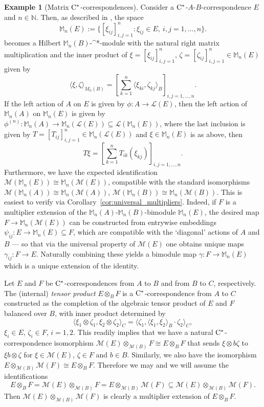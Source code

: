 \documentclass[11 pt, leqno]{amsart}
\numberwithin{equation}{section}
\theoremstyle{plain}
\theoremstyle{definition}
\newtheorem{ex}[thm]{Example}
\newcommand{\Mat}{\mathbb M} %
\newcommand{\M}{\mathcal M}
\renewcommand{\L}{\mathcal L}
\newcommand{\N}{\mathbb N}
\newcommand{\cst}{\ifmmode\mathrm{C}^*\else{$\mathrm{C}^*$}\fi}
\begin{document}
\begin{ex}[Matrix $\cst$-correspondences]\label{ex:matrixcorr}
Consider a $\cst$-$A$-$B$-correspondence $E$ and $n \in \N$. 
Then, as described in \cite[Section 3]{Ble}, the space
\[
    \Mat_n(E):=\{[\xi_{ij}]_{i,j=1}^n: \xi_{ij} \in E ,\ i,j=1,\ldots,n\}.
\]
becomes a Hilbert $\Mat_n(B)$-\cst-module with the natural right matrix multiplication and the inner product of $\xi=[\xi_{ij}]_{i,j=1}^n$,  $\zeta=[\zeta_{ij}]_{i,j=1}^n \in \Mat_n(E)$ given by 
\[ 
    \langle \xi, \zeta\rangle_{M_n(B)}= \left[\sum_{k=1}^n \langle \xi_{ki}, \zeta_{kj} \rangle_{B} \right]_{i,j=1,\ldots,n}.
\]
If the left action of $A$ on $E$ is given by $\phi:A\to \L(E)$, then the left action of $\Mat_n(A)$ on $\Mat_n(E)$ is given by $\phi^{(n)}:\Mat_n(A) \to \Mat_n(\L(E)) \subseteq \L(\Mat_n(E))$, where the last inclusion is given by $T=[T_{ij}]_{i,j=1}^n \in \Mat_n(\L(E))$ and $\xi \in \Mat_n (E)$ is as above, then 
\[ 
    T \xi = \left[\sum_{k=1}^n  T_{ik} (\xi_{kj}) \right]_{i,j=1,\ldots,n} . 
\]
Furthermore, we have the expected identification $\M(\Mat_n(E)) \cong \Mat_n(\M(E))$, compatible with the standard isomorphisms $\M(\Mat_n(A)) \cong \Mat_n(\M(A))$, $\M(\Mat_n(B)) \cong \Mat_n(\M(B))$. 
This is easiest to verify via Corollary~\ref{cor:universal_multipliers}. 
Indeed, if $F$ is a multiplier extension of the $\Mat_n(A)$-$\Mat_n(B)$-bimodule $\Mat_n(E)$, the desired map $F\to \Mat_n(\M(E))$ can be constructed from entrywise embeddings $\psi_{ij}:E \to \Mat_n(E) \subseteq F$, which are compatible with the `diagonal' actions of $A$ and $B$ --- so that via the universal property of $\M(E)$ one obtains unique maps $\gamma_{ij}:F \to E$. 
Naturally combining these yields a bimodule map $\gamma:F \to \Mat_n(E)$ which is a unique extension of the identity. 
\end{ex}

Let $E$ and $F$ be  $\cst$-correspondences from $A$ to $B$ and from $B$ to $C$, respectively. 
The (internal) \emph{tensor product} $E\otimes_B F$ is a $\cst$-correspondence from $A$ to $C$ constructed as the completion of the algebraic tensor product of $E$ and $F$ balanced over $B$, with inner product determined by 
\[
    \langle \xi_1\otimes \zeta_1,   \xi_2\otimes \zeta_2\rangle_{C}=\langle \zeta_1,   \langle \xi_1, \xi_2\rangle_{B}\cdot  \zeta_2\rangle_{C},
\] 
$\xi_i\in E$, $\zeta_i\in F$, $i=1,2$. 
This readily implies that we have a natural $\cst$-correspondence isomorphism $\M(E)\otimes_{\M(B)} F\cong E\otimes_{B} F$ that sends $\xi\otimes b\zeta$ to $\xi b\otimes \zeta$ for $\xi \in\M(E)$, $\zeta \in F$ and $b\in B$. 
Similarly, we also have the isomorphism $E\otimes_{\M(B)} \M(F)\cong E\otimes_{B} F$. Therefore we may and we will assume the identifications
\[
    E\otimes_{B} F= \M(E)\otimes_{\M(B)} F = E\otimes_{\M(B)} \M(F) \subseteq   \M(E)\otimes_{\M(B)}\M(F).
\]
Then $\M(E)\otimes_{\M(B)}\M(F)$ is clearly a multiplier extension of $E\otimes_{B} F$. 
\end{document}

